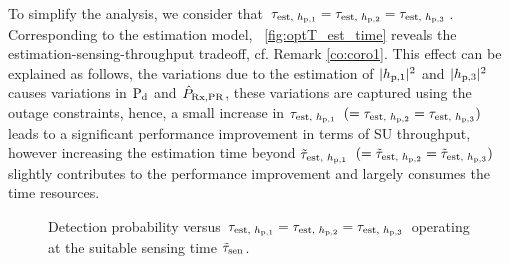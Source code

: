 To simplify the analysis, we consider that $\tau_{\text{est, $h_{\text{p,1}}$}} = \tau_{\text{est, $h_{\text{p,2}}$}} = \tau_{\text{est, $h_{\text{p,3}}$}}$. Corresponding to the estimation model, \figurename~\ref{fig:optT_est_time} reveals the estimation-sensing-throughput tradeoff, cf. Remark \ref{co:coro1}. This effect can be explained as follows, the variations due to the estimation of $|h_{\text{p,1}}|^2$ and $|h_{\text{p,3}}|^2$ causes variations in $\text{P}_{\text{d}}$ and $\hat{P}_{\text{Rx,PR}}$, these variations are captured using the outage constraints, hence, a small increase in $\tau_{\text{est, $h_{\text{p,1}}$}}$ $(= \tau_{\text{est, $h_{\text{p,2}}$}} = \tau_{\text{est, $h_{\text{p,3}}$}})$ leads to a significant performance improvement in terms of SU throughput, however increasing the estimation time beyond $\tilde{\tau}_{\text{est, $h_{\text{p,1}}$}}$ $(= \tilde{\tau}_{\text{est, $h_{\text{p,2}}$}}= \tilde{\tau}_{\text{est, $h_{\text{p,3}}$}})$ slightly contributes to the performance improvement and largely consumes the time resources. 

\begin{figure}[!t]

\centering
{}
\caption{Detection probability versus $\tau_{\text{est, $h_{\text{p,1}}$}} = \tau_{\text{est, $h_{\text{p,2}}$}} = \tau_{\text{est, $h_{\text{p,3}}$}}$ operating at the suitable sensing time $\tilde{\tau}_{\text{sen}}$.}
\label{fig:P_d_est_time}
\vspace{-0.6cm}
\end{figure}
